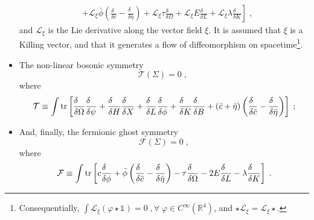 \documentclass[../main.tex]{subfiles}
\begin{document}
\begin{itemize}
\begin{align}
                      & + \left. \mathcal{L}_\xi\bar{\phi}\left(\frac{\delta\phantom{\bar{c}}}{\delta\bar{c}}-\frac{\delta\phantom{\bar{\eta}}}{\delta\bar{\eta}}\right) + \mathcal{L}_\xi\tau\frac{\delta\phantom{\Omega}}{\delta\Omega}+\mathcal{L}_\xi E\frac{\delta\phantom{L}}{\delta L}+\mathcal{L}_\xi \lambda\frac{\delta\phantom{K}}{\delta K}\right] \;,
        \end{align}
        and $ \mathcal{L}_{\xi} $ is the Lie derivative along the vector field $ \xi $. It is assumed that $\xi$ is a Killing vector, and that it generates a flow of diffeomorphism on spacetime\footnote{Consequentially, $\int \mathcal{L}_{\xi} \left( \varphi \star \mathds{1} \right) = 0 \;, \forall \; \varphi \in C^{ \infty }\left( \mathbb{R}^4 \right)$, and $ \star \mathcal{L}_\xi = \mathcal{L}_\xi \star $.}.
  \item  The non-linear bosonic symmetry
        \begin{equation}
          \label{eq:nl-bosonic-eq}
          \mathcal{T}\left(\Sigma\right)=0\;,
          \;
        \end{equation}
        where
        \begin{equation}
          \label{eq:t-operator}
          \mathcal{T} \equiv \int \tr \left[\frac{\delta\phantom{\Omega}}{\delta \Omega}\frac{\delta\phantom{\psi}}{\delta \psi} + \frac{\delta\phantom{H}}{\delta H}\frac{\delta\phantom{X}}{\delta X}+\frac{\delta\phantom{L}}{\delta L}\frac{\delta\phantom{\phi}}{\delta \phi}+\frac{\delta\phantom{K}}{\delta K}\frac{\delta\phantom{B}}{\delta B}+\left(\bar{c}+\bar{\eta}\right)\left(\frac{\delta\phantom{\bar{c}}}{\delta\bar{c}}-\frac{\delta\phantom{\bar{\eta}}}{\delta\bar{\eta}}\right)\right] \;;
        \end{equation}
  \item And, finally, the fermionic ghost symmetry
        \begin{equation}
          \label{eq:fermionicghostsymmetry}
          \mathcal{F}\left(\Sigma\right)=0 \;,
        \end{equation}
        where
        \begin{equation}
          \label{eq:fermionicghostop}
          \mathcal{F} \equiv \int \tr \left[c\frac{\delta\phantom{\phi}}{\delta \phi}+\bar{\phi}\left(\frac{\delta\phantom{\bar{c}}}{\delta\bar{c}}-\frac{\delta\phantom{\bar{\eta}}}{\delta\bar{\eta}}\right)-\tau\frac{\delta\phantom{\Omega}}{\delta \Omega}-2E\frac{\delta\phantom{L}}{\delta L}-\lambda\frac{\delta\phantom{K}}{\delta K}\right] \;.
        \end{equation}
\end{itemize}
\end{document}
